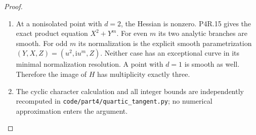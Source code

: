 \begin{proof}
\begin{enumerate}[label={$\langle1\rangle$\arabic*.},leftmargin=*]
\item At a nonisolated point with $d=2$, the Hessian is
nonzero. P4R.15 gives the exact product equation
$X^2+Y^m$. For even $m$ its two analytic branches
are smooth. For odd $m$ its normalization is the
explicit smooth parametrization
$(Y,X,Z)=(u^2,\mathrm i u^m,Z)$.
Neither case has an exceptional curve in its
minimal normalization resolution. A point with
$d=1$ is smooth as well. Therefore the image of
$H$ has multiplicity exactly three.

\item The cyclic character calculation and all integer
bounds are independently recomputed in
\texttt{code/part4/quartic\_tangent.py}; no numerical
approximation enters the argument.

\end{enumerate}
\end{proof}
